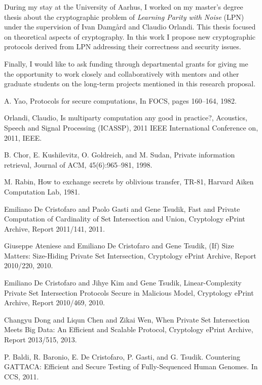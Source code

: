 \documentclass[dvips,12pt]{article}
\begin{document}
During my stay at the University of Aarhus, I worked on my master's degree thesis about the cryptographic problem of \emph{Learning Parity with Noise} (LPN) \cite{lpn} under the supervision of Ivan Damg{\aa}rd and Claudio Orlandi. 
This thesis focused on theoretical aspects of cryptography. In this work I propose new cryptographic protocols derived from LPN addressing their correctness and security issues.

Finally, I would like to ask funding through departmental grants for giving me the opportunity to work closely and collaboratively with mentors and other graduate students on the long-term projects mentioned in this research proposal.
\begin{thebibliography}{99}

	A. Yao,
	Protocols for secure computations,	
	In FOCS, pages 160–164, 1982.

	Orlandi, Claudio,  	
  	Is multiparty computation any good in practice?,
  	{Acoustics, Speech and Signal Processing (ICASSP), 2011 IEEE International Conference on},
  	2011,
  	IEEE.

	B. Chor, E. Kushilevitz, O. Goldreich, and M. Sudan,	
	Private information retrieval,
	Journal of ACM, 45(6):965–981, 
	1998.

	M. Rabin,
	How to exchange secrets by oblivious transfer,
	TR-81, Harvard Aiken Computation Lab, 
	1981.

	Emiliano De Cristofaro and Paolo Gasti and Gene Tsudik,	
	Fast and Private Computation of Cardinality of Set Intersection and Union, 
    Cryptology ePrint Archive, Report 2011/141,
    2011.
    
	Giuseppe Ateniese and Emiliano De Cristofaro and Gene Tsudik,
    (If) Size Matters: Size-Hiding Private Set Intersection,
    Cryptology ePrint Archive, Report 2010/220,
	2010.

	Emiliano De Cristofaro and Jihye Kim and Gene Tsudik,	
	Linear-Complexity Private Set Intersection Protocols Secure in Malicious Model,
	Cryptology ePrint Archive, Report 2010/469,
	2010.

	Changyu Dong and Liqun Chen and Zikai Wen,
	When Private Set Intersection Meets Big Data: An Efficient and Scalable Protocol,
	Cryptology ePrint Archive, Report 2013/515,
	2013.
	
	P. Baldi, R. Baronio, E. De Cristofaro, P. Gasti, and G. Tsudik. 
	Countering GATTACA: Efficient and Secure Testing of Fully-Sequenced Human Genomes.
	In CCS, 
	2011.
	

\end{thebibliography}
\end{document}
